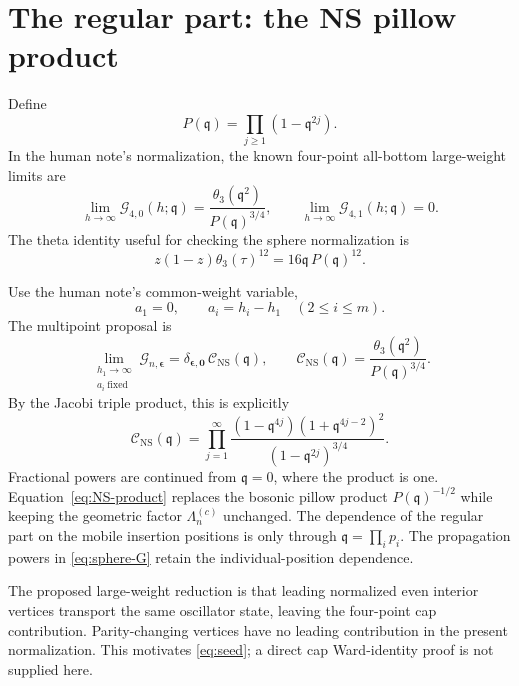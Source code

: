 \documentclass[11pt]{article}
\numberwithin{equation}{section}
\newcommand{\NS}{\mathrm{NS}}
\newcommand{\fq}{\mathfrak q}
\newcommand{\cG}{\mathcal G}
\newcommand{\cC}{\mathcal C}
\newcommand{\ve}{\boldsymbol\epsilon}
\begin{document}
\section{The regular part: the NS pillow product}
\label{sec:seed}

Define
\begin{equation}
 P(\fq)=\prod_{j\geq1}(1-\fq^{2j}).
\end{equation}
In the human note's normalization, the known four-point all-bottom
large-weight limits are~\cite{HJS}
\begin{equation}
 \lim_{h\to\infty}\cG_{4,0}(h;\fq)
 =\frac{\theta_3(\fq^2)}{P(\fq)^{3/4}},\qquad
 \lim_{h\to\infty}\cG_{4,1}(h;\fq)=0.
 \label{eq:four-seed}
\end{equation}
The theta identity useful for checking the sphere normalization is
\begin{equation}
 z(1-z)\theta_3(\tau)^{12}=16\fq\,P(\fq)^{12}.
 \label{eq:theta-identity}
\end{equation}

Use the human note's common-weight variable,
\begin{equation}
 a_1=0,\qquad a_i=h_i-h_1\quad(2\leq i\leq m).
\end{equation}
The multipoint proposal is
\begin{equation}
 \boxed{\quad
 \lim_{\substack{h_1\to\infty\\a_i\ \mathrm{fixed}}}
 \cG_{n,\ve}
 =\delta_{\ve,\boldsymbol0}\,\cC_{\NS}(\fq),\qquad
 \cC_{\NS}(\fq)
 =\frac{\theta_3(\fq^2)}{P(\fq)^{3/4}}.
 \quad}
 \label{eq:seed}
\end{equation}
By the Jacobi triple product, this is explicitly
\begin{equation}
 \boxed{\quad
 \cC_{\NS}(\fq)
 =\prod_{j=1}^{\infty}
 \frac{(1-\fq^{4j})(1+\fq^{4j-2})^2}
      {(1-\fq^{2j})^{3/4}}.
 \quad}
 \label{eq:NS-product}
\end{equation}
Fractional powers are continued from $\fq=0$, where the product is one.
Equation~\eqref{eq:NS-product} replaces the bosonic pillow product
$P(\fq)^{-1/2}$ while keeping the geometric factor
$\Lambda_n^{(c)}$ unchanged. The dependence of the regular part on the
mobile insertion positions is only through
$\fq=\prod_i p_i$. The propagation powers in \eqref{eq:sphere-G}
retain the individual-position dependence.

The proposed large-weight reduction is that leading normalized even
interior vertices transport the same oscillator state, leaving the
four-point cap contribution. Parity-changing vertices have no leading
contribution in the present normalization. This motivates
\eqref{eq:seed}; a direct cap Ward-identity proof is not supplied here.
\end{document}
